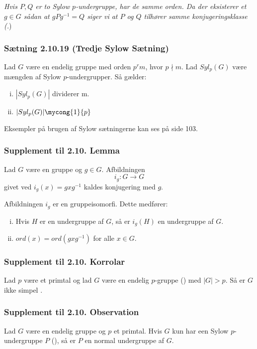 \textit{Hvis $P, Q$ er to Sylow $p$-undergruppe, har de samme orden. Da der
eksisterer et $g \in G$ sådan at $gPg^{-1} = Q$ siger vi at $P$ og $Q$ tilhører
samme konjugeringsklasse (.})

\subsubsection{Sætning 2.10.19 (Tredje Sylow Sætning)}
Lad $G$ være en endelig gruppe med orden $p^r m$, hvor $p \nmid m$. Lad $Syl_p
(G)$ være mængden af Sylow $p$-undergrupper. Så gælder:
\begin{enumerate}[(i)]
  \item $|Syl_p (G)|$ dividerer m.
  \item $|Syl_p (G)| \mycong{1}{p}$
\end{enumerate}
Eksempler på brugen af Sylow sætningerne kan ses på side 103.

\subsubsection{Supplement til 2.10. Lemma}
Lad $G$ være en gruppe og $g \in G$. Afbildningen 
\begin{equation*}
  i_g: G \rightarrow G
\end{equation*}
givet ved $i_g (x) = gxg^{-1}$ kaldes konjugering med $g$.

Afbildningen $i_g$ er en gruppeisomorfi. Dette medfører:
\begin{enumerate}[(i)]
  \item Hvis $H$ er en undergruppe af $G$, så er $i_g (H)$ en undergruppe af
  $G$.
  \item $ord(x) = ord(gxg^{-1})$ for alle $x \in G$.
\end{enumerate}

\subsubsection{Supplement til 2.10. Korrolar}
Lad $p$ være et primtal og lad $G$ være en endelig $p$-gruppe ()
med $|G|> p$. Så er $G$ ikke simpel .

\subsubsection{Supplement til 2.10. Observation}
Lad $G$ være en endelig gruppe og $p$ et primtal. Hvis $G$ kun har een Sylow
$p$-undergruppe $P$ (), så er $P$ en normal undergruppe af $G$.

